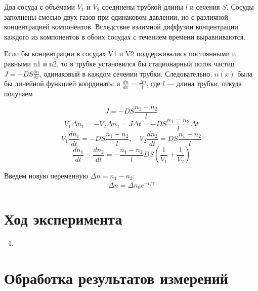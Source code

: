 \documentclass[a4paper,12pt]{article} %
\begin{document}
Два сосуда с объёмами $V_1$ и $V_2$ соединены трубкой длины $l$ и сечения $S$. Сосуды заполнены смесью двух газов при одинаковом давлении, но с различной концентрацией компонентов. Вследствие взаимной диффузии концентрации каждого из компонентов в обоих сосудах с течением времени выравниваются.

Если бы концентрации в сосудах V1 и V2 поддерживались постоянными и равными n1 и n2, то в трубке установился бы стационарный поток частиц $J = - DS \frac{\delta n}{\delta x}$, одинаковый в каждом сечении трубки. Следовательно, $n(x)$ была бы линейной функцией координаты и $\frac{dn}{dx} = \frac{\Delta n}{l}$, где $l$ — длина трубки, откуда получаем

\begin{equation}
  J = - DS \frac{n_1 - n_2}{l} 
\end{equation}
\begin{equation}
  V_1 \Delta n_1 = - V_2 \Delta n_2 = J \Delta t = - DS \frac{n_1 - n_2}{l} \Delta t
\end{equation}
\begin{equation}
  V_1 \frac{dn_1}{dt} = - DS \frac{n_1 - n_2}{l}, \quad V_2 \frac{dn_2}{dt} = DS \frac{n_1 - n_2}{l}
\end{equation}
\begin{equation}
  \frac{dn_1}{dt} - \frac{dn_2}{dt} = - \frac{n_1 - n_2}l DS (\frac1{V_1} + \frac1{V_2})
\end{equation}

Введем новую переменную $\Delta n = n_1 - n_2$:
\begin{equation}
  \Delta n = \Delta n_0 e^{-t/\tau}
\end{equation}



\section*{Ход эксперимента}

\begin{enumerate}
  \item
\end{enumerate}

\section*{Обработка результатов измерений}
\end{document}

